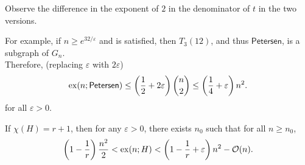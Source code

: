 \documentclass{article}
\begin{document}
			Observe the difference in the exponent of $2$ in the denominator of $t$ in the two versions.

			For example, if $n \ge e^{32/\varepsilon}$ and  is satisfied, then $T_{3}(12)$, and thus $\mathsf{Petersen}$, is a subgraph of $G_n$.\\
			Therefore, (replacing $\varepsilon$ with $2\varepsilon$)
			\[ \operatorname{ex}(n;\mathsf{Petersen}) \le \left(\frac{1}{2} + 2\varepsilon\right)\binom{n}{2} \le \left(\frac{1}{4} + \varepsilon\right)n^2. \]
			for all $\varepsilon > 0$.

			\begin{fcor}
				If $\chi(H) = r+1$, then for any $\varepsilon > 0$, there exists $n_0$ such that for all $n\ge n_0$,
				\[ \left(1 - \frac{1}{r}\right)\frac{n^2}{2} < \operatorname{ex}(n;H) < \left(1 - \frac{1}{r} + \varepsilon\right)n^2 - \mathcal{O}(n). \]
			\end{fcor}

\end{document}
